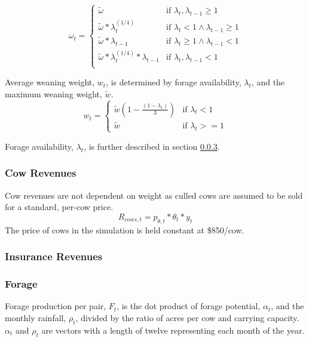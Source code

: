 \documentclass[11pt]{article}
\begin{document}
\begin{equation}
\omega_t =
\begin{cases}
\tilde{\omega}  &\text{if } \lambda_{t}, \lambda_{t-1} \ge 1  \\
\tilde{\omega} * \lambda_{t}^{(1/4)} &\text{if } \lambda_{t} < 1 \land \lambda_{t-1} \ge 1 \\
\tilde{\omega} * \lambda_{t - 1} &\text{if } \lambda_{t} \ge 1 \land \lambda_{t-1} < 1 \\
\tilde{\omega} * \lambda_{t}^{(1/4)} * \lambda_{t-1} &\text{if } \lambda_{t}, \lambda_{t-1} < 1 \\
\end{cases}
\end{equation}

Average weaning weight, $w_t$, is determined by forage availability, $\lambda_t$, and the maximum weaning weight, $\tilde{w}$.
\begin{equation} \label{calfdroughtweight}
w_{t} = 
\begin{cases}
\tilde{w} \left(1 - \frac{(1 - \lambda_t)}{3}\right) & \text{if } \lambda_t < 1 \\
\tilde{w} & \text{if } \lambda_t >= 1
\end{cases}
\end{equation}

Forage availability, $\lambda_t$, is further described in section \ref{forage}.

\subsubsection{Cow Revenues}
Cow revenues are not dependent on weight as culled cows are assumed to be sold for a standard, per-cow price.
\begin{equation}
R_{cows,t} = p_{\theta,t} * \theta_t * y_t 
\end{equation}
The price of cows in the simulation is held constant at \$850/cow.

\subsubsection{Insurance Revenues}


\subsubsection{Forage}
\label{forage}
Forage production per pair, $F_t$, is the dot product of forage potential, $\alpha_t$, and the monthly rainfall, $\rho_t$, divided by the ratio of acres per cow and carrying capacity. $\alpha_t$ and $\rho_t$ are vectors with a length of twelve representing each month of the year. 
\end{document}
